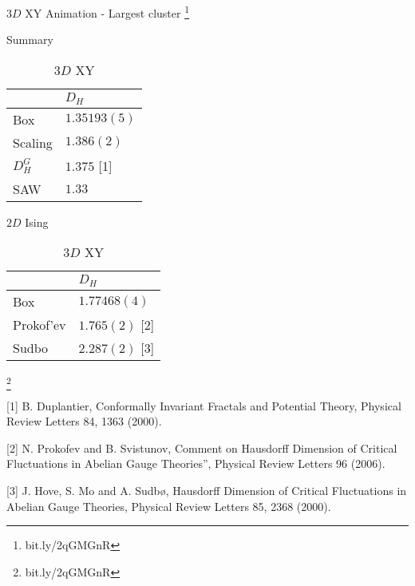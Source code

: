 \documentclass[10pt]{beamer}
\newcommand\blfootnote[1]{%
  \begingroup
  \renewcommand\thefootnote{}\footnote{#1}%
  \addtocounter{footnote}{-1}%
  \endgroup
}
\begin{document}

\begin{frame}{$3D$ XY Animation - Largest cluster}
   \blfootnote{bit.ly/2qGMGnR}
\end{frame}

\begin{frame}{Summary}
    \begin{table}
        \parbox{.45\linewidth}{
            \centering
            \begin{tabular}{l|l}
                               & $D_H$          \\ \hline
                Box            & $1.35193(5)$   \\ \hline
                Scaling        & $1.386(2)$      \\ \hline
                $D_H^G$        & $1.375$ [1]       \\ \hline
                SAW            & $1.33$                              
            \end{tabular}
            \caption{$2D$ Ising}
        }
        \hfill
        \parbox{.45\linewidth}{
            \centering
            \begin{tabular}{l|l}
                            & $D_H$           \\ \hline
                Box         & $1.77468(4)$    \\ \hline
                Prokof'ev   & $1.765(2)$ [2]      \\ \hline
                Sudbo       & $2.287(2)$ [3] 
            \end{tabular}
            \caption{$3D$ XY}
        }
    \end{table}
    \blfootnote{bit.ly/2qGMGnR}

\footnotesize [1] B. Duplantier, Conformally Invariant Fractals and Potential Theory, Physical Review Letters 84, 1363 (2000).
    
\footnotesize [2] N. Prokofev and B. Svistunov, Comment on Hausdorff Dimension of Critical Fluctuations in Abelian Gauge Theories”, Physical Review Letters 96 (2006).

\footnotesize [3] J. Hove, S. Mo and A. Sudbø, Hausdorff Dimension of Critical Fluctuations in Abelian Gauge Theories, Physical Review Letters 85, 2368 (2000).

\end{frame}
\end{document}
